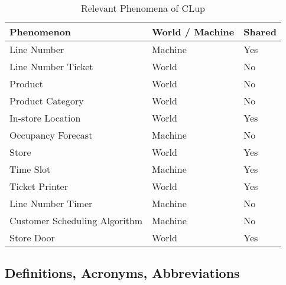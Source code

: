 \begin{table}[H]
    \begin{tabular}{|p{4cm}|p{4cm}|p{4cm}|}
        \hline
        \textbf{Phenomenon}    & \textbf{World / Machine}       & \textbf{Shared } \\ \hline
        Line Number & Machine & Yes \\ \hline
        Line Number Ticket & World & No \\ \hline
        Product & World & No \\ \hline
        Product Category & World & No \\ \hline
        In-store Location & World & Yes \\ \hline
        Occupancy Forecast & Machine & No \\ \hline
        Store & World & Yes \\ \hline
        Time Slot & Machine & Yes \\ \hline
        Ticket Printer & World & Yes \\ \hline
        Line Number Timer & Machine & No \\ \hline
        Customer Scheduling Algorithm & Machine & No \\ \hline
        Store Door & World & Yes \\ \hline
    \end{tabular}
    \caption{Relevant Phenomena of CLup}
\end{table}



\subsection{Definitions, Acronyms, Abbreviations}
